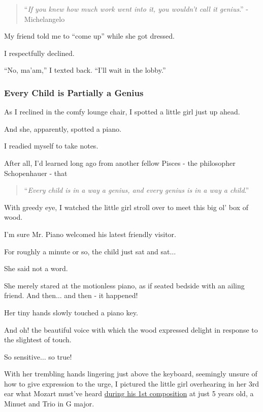 \documentclass{article}
\begin{document}
\begin{quotation}
	``\textit{If you knew how much work went into it, you wouldn't call it genius}.'' - Michelangelo
\end{quotation}
My friend told me to ``come up'' while she got dressed.

I respectfully declined.

%
``No, ma'am,'' I texted back. ``I'll wait in the lobby.''

\subsubsection{Every Child is Partially a Genius}
As I reclined in the comfy lounge chair, I spotted a little girl just up ahead.

And she, apparently, spotted a piano.

%
I readied myself to take notes.

After all, I'd learned long ago from another fellow Pisces - the philosopher Schopenhauer - that

\begin{quotation}
	``\textit{Every child is in a way a genius, and every genius is in a way a child}.''
\end{quotation}
With greedy eye, I watched the little girl stroll over to meet this big ol' box of wood.

I'm sure Mr. Piano welcomed his latest friendly visitor.

%
For roughly a minute or so, the child just sat and sat$\ldots$

%
She said not a word.

She merely stared at the motionless piano, as if seated bedside with an ailing friend. And then$\ldots$ and then - it happened!

%
Her tiny hands slowly touched a piano key.

And oh! the beautiful voice with which the wood expressed delight in response to the slightest of touch.

%
So sensitive$\ldots$ so true!

%
With her trembling hands lingering just above the keyboard, seemingly unsure of how to give expression to the urge, I pictured the little girl overhearing in her 3rd ear what Mozart must've heard \href{https://www.classicfm.com/composers/mozart/guides/first-composition-minuet-trio/#:~:text=His%20first%20documented%20composition%2C%20a,was%20just%20five%20years%20old.}{during his 1st composition} at just 5 years old, a Minuet and Trio in G major.
\end{document}
